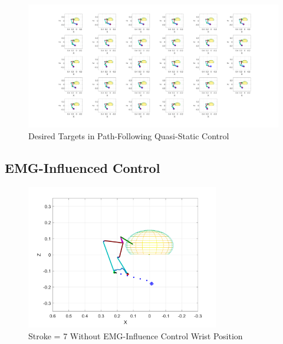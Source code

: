 \newpage
\begin{landscape} %
  \begin{figure}[h!]
    \centering
    \includegraphics[width=1.7\textwidth]{Pictures/Results/Controller/QSC29positions.png}
    \caption{Desired Targets in Path-Following Quasi-Static Control} 
  \end{figure}
\end{landscape} %

\subsection{EMG-Influenced Control}

\begin{figure}[h!]
\centering
\includegraphics[width=0.75\textwidth]{Pictures/Results/Controller/StrokeWithouControl_WP.png} 
\caption{Stroke = 7 Without EMG-Influence Control Wrist Position} %
\label{fig:WOEMGWP} %
\end{figure}

